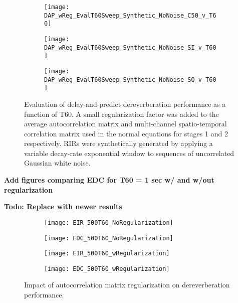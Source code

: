 \begin{figure}[H]
	\centering
	\begin{subfigure}[b]{0.47\textwidth}
		\centering
		\texttt{[image: DAP\_wReg\_EvalT60Sweep\_Synthetic\_NoNoise\_C50\_v\_T60]}
	\end{subfigure}
	\begin{subfigure}[b]{0.92\textwidth}
		\centering
		\texttt{[image: DAP\_wReg\_EvalT60Sweep\_Synthetic\_NoNoise\_SI\_v\_T60]}
	\end{subfigure}
	\begin{subfigure}[b]{0.92\textwidth}
		\centering
		\texttt{[image: DAP\_wReg\_EvalT60Sweep\_Synthetic\_NoNoise\_SQ\_v\_T60]}
	\end{subfigure}
	\caption{Evaluation of delay-and-predict dereverberation performance as a function of T60. A small regularization factor was added to the average autocorrelation matrix and multi-channel spatio-temporal correlation matrix used in the normal equations for stages 1 and 2 respectively. RIRs were synthetically generated by applying a variable decay-rate exponential window to sequences of uncorrelated Gaussian white noise.}
	\label{fig:DAP_wReg_EvalT60Sweep_Synthetic_NoNoise}
\end{figure}

\textbf{Add figures comparing EDC for T60 = 1 sec w/ and w/out regularization}


\textbf{Todo: Replace with newer results}

\begin{figure}[H]
	\centering
	\begin{subfigure}[b]{0.45\textwidth}
		\centering
		\texttt{[image: EIR\_500T60\_NoRegularization]}
	\end{subfigure}
	\hfill
	\begin{subfigure}[b]{0.45\textwidth}
		\centering
		\texttt{[image: EDC\_500T60\_NoRegularization]}
	\end{subfigure}
	
	\begin{subfigure}[b]{0.45\textwidth}
		\centering
		\texttt{[image: EIR\_500T60\_wRegularization]}
	\end{subfigure}
	\hfill
	\begin{subfigure}[b]{0.45\textwidth}
		\centering
		\texttt{[image: EDC\_500T60\_wRegularization]}
	\end{subfigure}
	\caption{Impact of autocorrelation matrix regularization on dereverberation performance.}
	\label{fig:params_regularization}
\end{figure}


